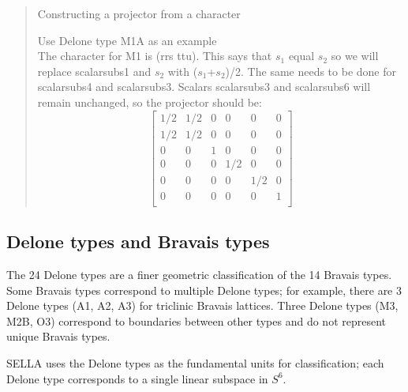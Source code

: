 \documentclass[preprint]{iucr}              %
\newcommand{\scalarsub}[2]{$#1_#2$}
\begin{document}
	\begin{quote}
		Constructing a projector from a character
		
		Use Delone type M1A as an example\\
		The character for M1 is (rrs ttu). This says that \scalarsub{s}{1} equal \scalarsub{s}{2}
		so we will replace scalarsub{s}{1} and \scalarsub{s}{2} with (\scalarsub{s}{1}+\scalarsub{s}{2})/2. The same needs to be 
		done for scalarsub{s}{4} and scalarsub{s}{3}. Scalars
		scalarsub{s}{3} and scalarsub{s}{6} will remain unchanged, so
		the projector should be:		
		\[
		\begin{bmatrix}
			1/2 & 1/2 & 0 & 0 & 0 & 0 \\
			1/2 & 1/2 & 0 & 0 & 0 & 0 \\
			0 & 0 & 1 & 0 & 0 & 0 \\
			0 & 0 & 0 & 1/2 & 0 & 0 \\
			0 & 0 & 0 & 0 & 1/2 & 0 \\
			0 & 0 & 0 & 0 & 0 & 1 \\			
		\end{bmatrix}
		\]
	\end{quote}
	
	
	\subsection{Delone types and Bravais types}
	
	The 24 Delone types are a finer geometric classification of the 14 Bravais types. Some Bravais types correspond to
	multiple Delone types; for example, there are 3 Delone types (A1, A2, A3)
	for triclinic Bravais lattices. Three Delone types (M3, M2B, O3) correspond to boundaries
	between other types and do not represent unique Bravais types.
	
	SELLA uses the Delone types as the fundamental units for classification;
	each Delone type corresponds to a single linear subspace in $S^6$.
	
\end{document}

